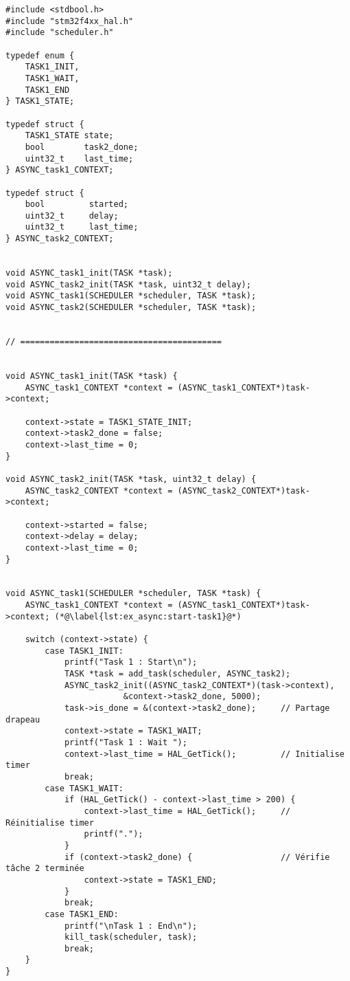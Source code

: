 \begin{lstlisting}[style=prog, frame=shadowbox, caption={Exemple asynchrone}, label={lst:ex_async},
    emph={[1]ASYNC_task1, ASYNC_task2, ASYNC_task1_init, ASYNC_task2_init, init_scheduler, add_task, kill_task, run_task,
    run_scheduler, HAL_GetTick, printf}, emphstyle={[1]\color{C}},
    emph={[2]SCHEDULER, TASK, TASK1_STATE, ASYNC_task1_CONTEXT, ASYNC_task2_CONTEXT}, emphstyle={[2]\color{E}}]
#include <stdbool.h>
#include "stm32f4xx_hal.h"
#include "scheduler.h"

typedef enum {
    TASK1_INIT,
    TASK1_WAIT,
    TASK1_END
} TASK1_STATE;

typedef struct {
    TASK1_STATE state;
    bool        task2_done;
    uint32_t    last_time;
} ASYNC_task1_CONTEXT;

typedef struct {
    bool         started;
    uint32_t     delay;
    uint32_t     last_time;
} ASYNC_task2_CONTEXT;


void ASYNC_task1_init(TASK *task);
void ASYNC_task2_init(TASK *task, uint32_t delay);
void ASYNC_task1(SCHEDULER *scheduler, TASK *task);
void ASYNC_task2(SCHEDULER *scheduler, TASK *task);


// =========================================


void ASYNC_task1_init(TASK *task) {
    ASYNC_task1_CONTEXT *context = (ASYNC_task1_CONTEXT*)task->context;

    context->state = TASK1_STATE_INIT;
    context->task2_done = false;
    context->last_time = 0;
}

void ASYNC_task2_init(TASK *task, uint32_t delay) {
    ASYNC_task2_CONTEXT *context = (ASYNC_task2_CONTEXT*)task->context;

    context->started = false;
    context->delay = delay;
    context->last_time = 0;
}


void ASYNC_task1(SCHEDULER *scheduler, TASK *task) {
    ASYNC_task1_CONTEXT *context = (ASYNC_task1_CONTEXT*)task->context; (*@\label{lst:ex_async:start-task1}@*)

    switch (context->state) {
        case TASK1_INIT:
            printf("Task 1 : Start\n");
            TASK *task = add_task(scheduler, ASYNC_task2);
            ASYNC_task2_init((ASYNC_task2_CONTEXT*)(task->context),
                        &context->task2_done, 5000);
            task->is_done = &(context->task2_done);     // Partage drapeau
            context->state = TASK1_WAIT;
            printf("Task 1 : Wait ");
            context->last_time = HAL_GetTick();         // Initialise timer
            break;
        case TASK1_WAIT:
            if (HAL_GetTick() - context->last_time > 200) {
                context->last_time = HAL_GetTick();     // Réinitialise timer
                printf(".");
            }
            if (context->task2_done) {                  // Vérifie tâche 2 terminée
                context->state = TASK1_END;
            }
            break;
        case TASK1_END:
            printf("\nTask 1 : End\n");
            kill_task(scheduler, task);
            break;
    }
}


\end{lstlisting}

